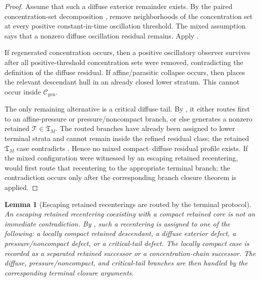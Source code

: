 \documentclass[11pt]{amsart}
\numberwithin{equation}{section}
\theoremstyle{plain}
\newtheorem{lemma}[lemma]{Lemma}
\theoremstyle{definition}
\theoremstyle{remark}
\newcommand{\Cgen}{\mathcal C_{\mathrm{gen}}}
\newcommand{\Tcrit}{\mathfrak T_M}
\begin{document}
\begin{proof}
Assume that such a diffuse exterior remainder exists.  By the paired
concentration-set decomposition , remove
neighborhoods of the concentration set at every positive constant-in-time oscillation
threshold.  The mixed assumption says that a nonzero diffuse oscillation
residual remains.  Apply .

If regenerated concentration occurs, then a positive oscillatory observer
survives after all positive-threshold concentration sets were removed, contradicting
the definition of the diffuse residual.  If affine/parasitic collapse occurs,
then  places
the relevant descendant hull in an already closed lower stratum.  This cannot
occur inside \(\Cgen\).

The only remaining alternative is a critical diffuse tail.  By
, it either routes first to
an affine-pressure or pressure/noncompact branch, or else generates a nonzero
retained \(\mathcal T\in\Tcrit\).  The routed
branches have already been assigned to lower terminal strata and cannot remain
inside the refined residual class; the retained \(\Tcrit\) case contradicts
.  Hence no mixed compact--diffuse residual
profile exists.  If the mixed configuration were witnessed by an escaping
retained recentering,  would
first route that recentering to the appropriate terminal branch; the
contradiction occurs only after the corresponding branch closure theorem is
applied.
\end{proof}

\begin{lemma}[Escaping retained recenterings are routed by the terminal protocol]
\label{lem:escaping-retained-recentering-routing}
An escaping retained recentering coexisting with a compact retained core is not
an immediate contradiction.  By
, such a recentering is assigned to
one of the following: a locally compact retained descendant, a diffuse exterior
defect, a pressure/noncompact defect, or a critical-tail defect.  The locally
compact case is recorded as a separated retained successor or a
concentration-chain successor.  The diffuse, pressure/noncompact, and
critical-tail branches are then handled by the corresponding terminal closure
arguments.
\end{lemma}
\end{document}
